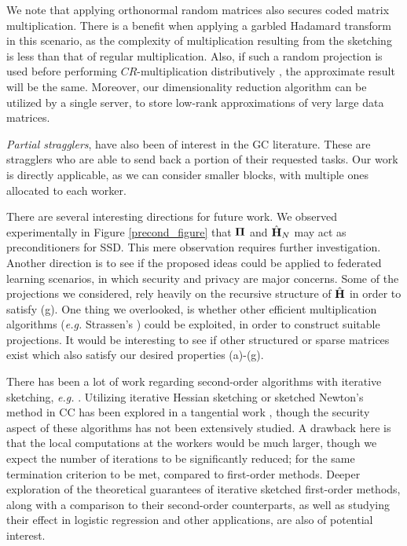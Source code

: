 \documentclass[journal,letterpaper,onecolumn,twoside,nofonttune]{IEEEtran}
\newcommand{\Pibold}{\bold{\Pi}}
\newcommand{\Hbh}{\hat{\bold{H}}}
\begin{document}
We note that applying orthonormal random matrices also secures coded matrix multiplication. There is a benefit when applying a garbled Hadamard transform in this scenario, as the complexity of multiplication resulting from the sketching is less than that of regular multiplication. Also, if such a random projection is used before performing $CR$-multiplication distributively \cite{CT19,CPH20c,RCHV23}, the approximate result will be the same. Moreover, our dimensionality reduction algorithm can be utilized by a single server, to store low-rank approximations of very large data matrices.

\textit{Partial stragglers}, have also been of interest in the GC literature. These are stragglers who are able to send back a portion of their requested tasks. Our work is directly applicable, as we can consider smaller blocks, with multiple ones allocated to each worker.

There are several interesting directions for future work. We observed experimentally in Figure \ref{precond_figure} that $\Pibold$ and $\Hbh_N$ may act as preconditioners for SSD. This mere observation requires further investigation. Another direction is to see if the proposed ideas could be applied to federated learning scenarios, in which security and privacy are major concerns. Some of the projections we considered, rely heavily on the recursive structure of $\Hbh$ in order to satisfy (g). One thing we overlooked, is whether other efficient multiplication algorithms (\textit{e.g.} Strassen's \cite{Str69}) could be exploited, in order to construct suitable projections. It would be interesting to see if other structured or sparse matrices exist which also satisfy our desired properties (a)-(g).

There has been a lot of work regarding second-order algorithms with iterative sketching, \textit{e.g.} \cite{PW16,LLDP20}. Utilizing iterative Hessian sketching or sketched Newton's method in CC has been explored in a tangential work \cite{GKCMR20}, though the security aspect of these algorithms has not been extensively studied. A drawback here is that the local computations at the workers would be much larger, though we expect the number of iterations to be significantly reduced; for the same termination criterion to be met, compared to first-order methods. Deeper exploration of the theoretical guarantees of iterative sketched first-order methods, along with a comparison to their second-order counterparts, as well as studying their effect in logistic regression and other applications, are also of potential interest.
\end{document}
